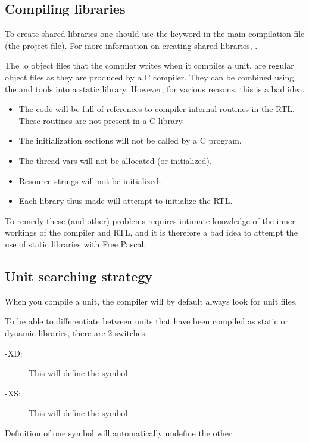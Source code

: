 \subsection {Compiling libraries}
To create shared libraries one should use the  keyword in the
main compilation file (the project file). 
For more information on creating shared libraries, .

The .o object files that the compiler writes when it compiles a unit, 
are regular object files as they are produced by a C compiler. 
They can be combined using the  and  tools into 
a static library. However, for various reasons, this is a bad idea.
\begin{itemize}
\item The code will be full of references to compiler internal routines in
the RTL. These routines are not present in a C library.
\item The initialization sections will not be called by a C program.
\item The thread vars will not be allocated (or initialized).
\item Resource strings will not be initialized.
\item Each library thus made will attempt to initialize the RTL. 
\end{itemize}
To remedy these (and other) problems requires intimate knowledge of the
inner workings of the compiler and RTL, and it is therefore a bad idea to
attempt the use of static libraries with Free Pascal.

\subsection{Unit searching strategy}

When you compile a unit, the compiler will by
default always look for unit files.

To be able to differentiate between units that have been compiled as static
or dynamic libraries, there are 2 switches:

\begin{description}
\item [-XD:\ ] This will define the symbol 
\item [-XS:\ ] This will define the symbol 
\end{description}
Definition of one symbol will automatically undefine the other.

